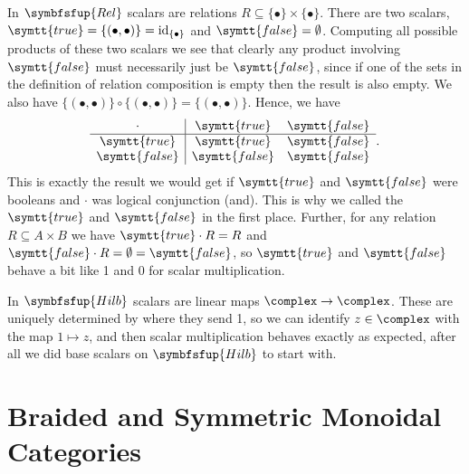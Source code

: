 \documentclass[fleqn]{NotesClass}
\makeatletter
\newcommand{\c@egory}[1]{\symbfsfup{#1}}
\newcommand{\Rel}{\c@egory{Rel}}
\newcommand{\Hilb}{\c@egory{Hilb}}
\DeclareMathOperator{\id}{id}
\newcommand{\true}{\symtt{true}}
\newcommand{\false}{\symtt{false}}
\makeatother
\begin{document}
    In \(\Rel\) scalars are relations \(R \subseteq \{\bullet\} \times \{\bullet\}\).
    There are two scalars, \(\true = \{(\bullet, \bullet)\} = \id_{\{\bullet\}}\) and \(\false = \emptyset\).
    Computing all possible products of these two scalars we see that clearly any product involving \(\false\) must necessarily just be \(\false\), since if one of the sets in the definition of relation composition is empty then the result is also empty.
    We also have \(\{(\bullet, \bullet)\} \circ \{(\bullet, \bullet)\} = \{(\bullet, \bullet)\}\).
    Hence, we have
    \begin{equation}
        \begin{array}{c|cc}
            \cdot & \true & \false\\ \hline
            \true & \true & \false\\
            \false & \false & \false
        \end{array}
        .
    \end{equation}
    This is exactly the result we would get if \(\true\) and \(\false\) were booleans and \(\cdot\) was logical conjunction (and).
    This is why we called the \(\true\) and \(\false\) in the first place.
    Further, for any relation \(R  \subseteq A \times B\) we have \(\true \cdot R = R\) and \(\false \cdot R = \emptyset = \false\), so \(\true\) and \(\false\) behave a bit like 1 and 0 for scalar multiplication.
    
    In \(\Hilb\) scalars are linear maps \(\complex \to \complex\).
    These are uniquely determined by where they send 1, so we can identify \(z \in \complex\) with the map \(1 \mapsto z\), and then scalar multiplication behaves exactly as expected, after all we did base scalars on \(\Hilb\) to start with.
    
    \chapter{Braided and Symmetric Monoidal Categories}
\end{document}
